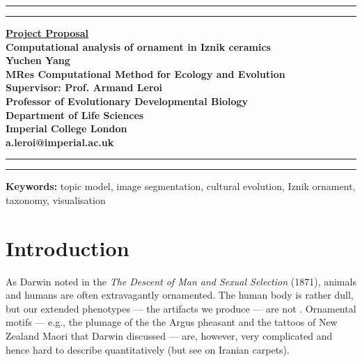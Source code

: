 \documentclass[10pt]{article}
\newcommand{\soptitle}{Computational analysis of ornament in Iznik ceramics}
\begin{document}
\begin{titlepage}
\begin{center}
\hrule
\vspace{2pt}
\hrule
\vspace{2cm}
\LARGE {\bf \underline{Project Proposal}}\\
\vspace{2cm}
\huge{\bf \soptitle}\\
\vspace{4cm}
\LARGE {\bf Yuchen Yang}\\
\large {\bf MRes Computational Method for Ecology and Evolution}\\
\vfill
\LARGE {\bf Supervisor: Prof. Armand Leroi}\\
\large {\bf Professor of Evolutionary Developmental Biology}\\
\large {\bf Department of Life Sciences}\\
\large {\bf Imperial College London}\\
\large {\bf a.leroi@imperial.ac.uk}
\end{center}
\hrule
\vspace{2pt}
\hrule
\end{titlepage}
\linenumbers

{\bf Keywords: }topic model, image segmentation, cultural evolution, Iznik ornament, taxonomy, visualisation

\section*{Introduction}

As Darwin noted in the \emph{The Descent of Man and Sexual Selection} (1871), animals and humans are often extravagantly ornamented. The human body is rather dull, but our extended phenotypes --- the artifacts we produce --- are not \parencite{Jones1856, Gombrich1994, Trilling2001}. Ornamental motifs --- e.g., the plumage of the the Argus pheasant and the tattoos of New Zealand Maori that Darwin discussed --- are, however, very complicated and hence hard to describe quantitatively (but see \cite{Tehrani2009} on Iranian carpets).
\end{document}
